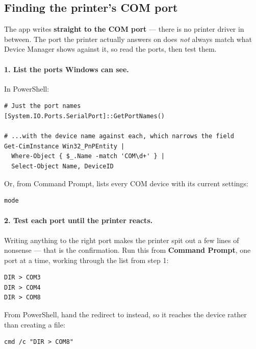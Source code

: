 \documentclass[a4paper,10pt]{article}
\begin{document}
\subsection{Finding the printer's COM port}\label{sec:comport}

\begin{wkwarn}
The app writes \textbf{straight to the COM port} --- there is no printer
driver in between. The port the printer actually answers on does
\emph{not} always match what Device Manager shows against it, so read the
ports, then test them.
\end{wkwarn}

\paragraph{1. List the ports Windows can see.} In PowerShell:

\begin{lstlisting}
# Just the port names
[System.IO.Ports.SerialPort]::GetPortNames()

# ...with the device name against each, which narrows the field
Get-CimInstance Win32_PnPEntity |
  Where-Object { $_.Name -match 'COM\d+' } |
  Select-Object Name, DeviceID
\end{lstlisting}

Or, from Command Prompt,  lists every COM device with its
current settings:

\begin{lstlisting}
mode
\end{lstlisting}

\paragraph{2. Test each port until the printer reacts.} Writing anything
to the right port makes the printer spit out a few lines of nonsense ---
that is the confirmation. Run this from \textbf{Command Prompt}, one port
at a time, working through the list from step 1:

\begin{lstlisting}
DIR > COM3
DIR > COM4
DIR > COM8
\end{lstlisting}

From PowerShell, hand the redirect to  instead, so it reaches
the device rather than creating a file:

\begin{lstlisting}
cmd /c "DIR > COM8"
\end{lstlisting}
\end{document}
